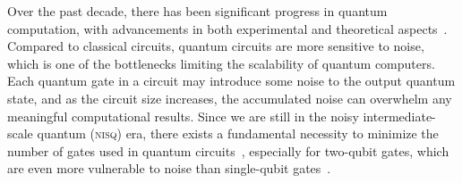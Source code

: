 \documentclass[a4paper,cleveref, autoref, 11pt, fleqn, thm-restate]{article}
\theoremstyle{plain}
\begin{document}
Over the past decade, there has been significant progress in quantum computation, with advancements in both experimental and theoretical aspects~\cite{bravyiHighthresholdLowoverheadFaulttolerant2024,kallaugherExponentialQuantumSpace2023a,niBeatingBreakevenPoint2023,caoGenerationGenuineEntanglement2023}.  Compared to classical circuits, quantum circuits are more sensitive to noise, which is one of the bottlenecks limiting the scalability of quantum computers. Each quantum gate in a circuit may introduce some noise to the output quantum state, and as the circuit size increases, the accumulated noise can overwhelm any meaningful computational results.  Since we are still in the noisy intermediate-scale quantum (\textsc{nisq}) era, there exists a fundamental necessity to minimize the number of gates used in quantum circuits~\cite{Mottonen2004a,Vartiainen2004,10.5555/3381089.3381102,Wu2023}, especially for two-qubit gates, which are even more vulnerable to noise than single-qubit gates~\cite{caoGenerationGenuineEntanglement2023,Li2023}.
\end{document}
